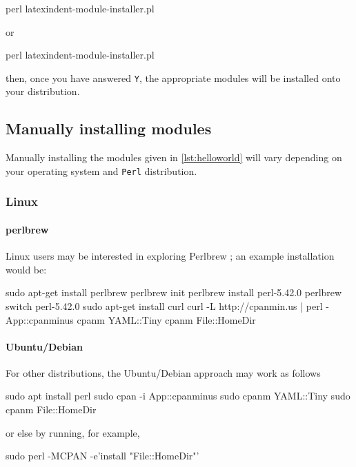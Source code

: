   \begin{commandshell}
perl latexindent-module-installer.pl
\end{commandshell}

  or
  \begin{dosprompt}
perl latexindent-module-installer.pl
 \end{dosprompt}
  then, once you have answered \texttt{Y}, the appropriate modules will be installed onto
  your distribution.

 \subsection{Manually installing modules}\label{sec:manual-module-instal}
  Manually installing the modules given in \cref{lst:helloworld} will vary depending on
  your operating system and \texttt{Perl} distribution.

 \subsubsection{Linux}
  \paragraph{perlbrew}
   Linux users may be interested in exploring Perlbrew \cite{perlbrew}; an example
   installation would be:

   \begin{commandshell}
sudo apt-get install perlbrew
perlbrew init
perlbrew install perl-5.42.0
perlbrew switch perl-5.42.0
sudo apt-get install curl
curl -L http://cpanmin.us | perl - App::cpanminus
cpanm YAML::Tiny
cpanm File::HomeDir
\end{commandshell}


  \paragraph{Ubuntu/Debian}
   For other distributions, the Ubuntu/Debian approach may work as follows

   \begin{commandshell}
sudo apt install perl
sudo cpan -i App::cpanminus
sudo cpanm YAML::Tiny
sudo cpanm File::HomeDir
\end{commandshell}

   or else by running, for example,

   \begin{commandshell}
sudo perl -MCPAN -e'install "File::HomeDir"'
\end{commandshell}

